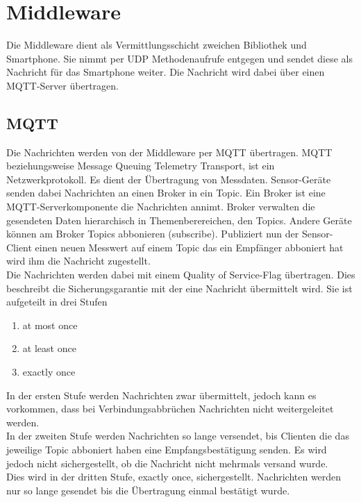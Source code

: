 \documentclass[11pt,a4paper]{report}
\begin{document}
\section*{Middleware}
Die Middleware dient als Vermittlungsschicht zweichen Bibliothek und Smartphone.
Sie nimmt per UDP Methodenaufrufe entgegen und sendet diese als Nachricht für das Smartphone weiter.
Die Nachricht wird dabei über einen MQTT-Server übertragen.

\subsection*{MQTT}
Die Nachrichten werden von der Middleware per MQTT übertragen.
MQTT beziehungsweise Message Queuing Telemetry Transport, ist ein Netzwerkprotokoll.
Es dient der Übertragung von Messdaten.
Sensor-Geräte senden dabei Nachrichten an einen Broker in ein Topic.
Ein Broker ist eine MQTT-Serverkomponente die Nachrichten annimt.
Broker verwalten die gesendeten Daten hierarchisch in Themenberereichen, den Topics.
Andere Geräte können am Broker Topics abbonieren (subscribe).
Publiziert nun der Sensor-Client einen neuen Messwert auf einem Topic das ein Empfänger abboniert hat wird ihm die Nachricht zugestellt.
\\
Die Nachrichten werden dabei mit einem Quality of Service-Flag übertragen.
Dies beschreibt die Sicherungsgarantie mit der eine Nachricht übermittelt wird.
Sie ist aufgeteilt in drei Stufen
\begin{enumerate}
  \item at most once
  \item at least once
  \item exactly once
\end{enumerate}
In der ersten Stufe werden Nachrichten zwar übermittelt, jedoch kann es vorkommen, dass bei Verbindungsabbrüchen Nachrichten nicht weitergeleitet werden.
\\
In der zweiten Stufe werden Nachrichten so lange versendet, bis Clienten die das jeweilige Topic abboniert haben eine Empfangsbestätigung senden.
Es wird jedoch nicht sichergestellt, ob die Nachricht nicht mehrmals versand wurde.
\\
Dies wird in der dritten Stufe, exactly once, sichergestellt. 
Nachrichten werden nur so lange gesendet bis die Übertragung einmal bestätigt wurde.
\end{document}
